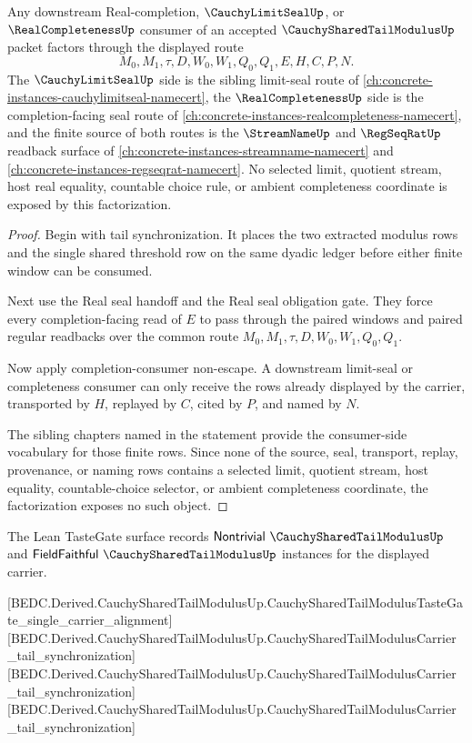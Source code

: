 \begin{theorem}
\label{thm:cauchy-shared-tail-modulus-downstream-consumer-factorization}
Any downstream Real-completion, $\CauchyLimitSealUp$, or $\RealCompletenessUp$ consumer of an accepted $\CauchySharedTailModulusUp$ packet factors through the displayed route
$$
M_0,M_1,\tau,D,W_0,W_1,Q_0,Q_1,E,H,C,P,N.
$$
The $\CauchyLimitSealUp$ side is the sibling limit-seal route of \autoref{ch:concrete-instances-cauchylimitseal-namecert}, the $\RealCompletenessUp$ side is the completion-facing seal route of \autoref{ch:concrete-instances-realcompleteness-namecert}, and the finite source of both routes is the $\StreamNameUp$ and $\RegSeqRatUp$ readback surface of \autoref{ch:concrete-instances-streamname-namecert} and \autoref{ch:concrete-instances-regseqrat-namecert}. No selected limit, quotient stream, host real equality, countable choice rule, or ambient completeness coordinate is exposed by this factorization.
\end{theorem}
\begin{proof}
Begin with tail synchronization. It places the two extracted modulus rows and the single shared threshold row on the same dyadic ledger before either finite window can be consumed.

Next use the Real seal handoff and the Real seal obligation gate. They force every completion-facing read of $E$ to pass through the paired windows and paired regular readbacks over the common route $M_0,M_1,\tau,D,W_0,W_1,Q_0,Q_1$.

Now apply completion-consumer non-escape. A downstream limit-seal or completeness consumer can only receive the rows already displayed by the carrier, transported by $H$, replayed by $C$, cited by $P$, and named by $N$.

The sibling chapters named in the statement provide the consumer-side vocabulary for those finite rows. Since none of the source, seal, transport, replay, provenance, or naming rows contains a selected limit, quotient stream, host equality, countable-choice selector, or ambient completeness coordinate, the factorization exposes no such object.
\end{proof}

The Lean TasteGate surface records $\mathsf{Nontrivial}\ \CauchySharedTailModulusUp$ and $\mathsf{FieldFaithful}\ \CauchySharedTailModulusUp$ instances for the displayed carrier.

[BEDC.Derived.CauchySharedTailModulusUp.CauchySharedTailModulusTasteGate\_single\_carrier\_alignment]
[BEDC.Derived.CauchySharedTailModulusUp.CauchySharedTailModulusCarrier\_tail\_synchronization]
[BEDC.Derived.CauchySharedTailModulusUp.CauchySharedTailModulusCarrier\_tail\_synchronization]
[BEDC.Derived.CauchySharedTailModulusUp.CauchySharedTailModulusCarrier\_tail\_synchronization]

